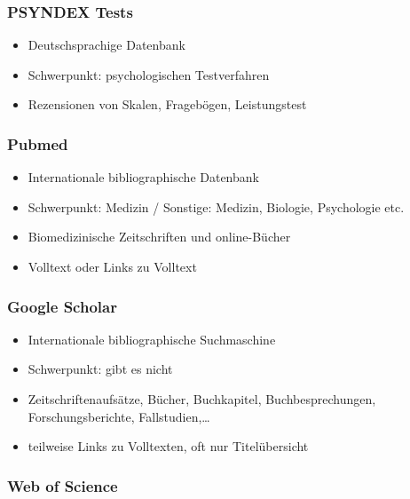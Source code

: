 \documentclass[
]{book}
\providecommand{\tightlist}{%
  \setlength{\itemsep}{0pt}\setlength{\parskip}{0pt}}
\begin{document}
\hypertarget{psyndex-tests}{%
\subsubsection{PSYNDEX Tests}\label{psyndex-tests}}

\begin{itemize}
\tightlist
\item
  Deutschsprachige Datenbank
\item
  Schwerpunkt: psychologischen Testverfahren
\item
  Rezensionen von Skalen, Fragebögen, Leistungstest
\end{itemize}

\hypertarget{pubmed}{%
\subsubsection{Pubmed}\label{pubmed}}

\begin{itemize}
\tightlist
\item
  Internationale bibliographische Datenbank
\item
  Schwerpunkt: Medizin / Sonstige: Medizin, Biologie, Psychologie etc.
\item
  Biomedizinische Zeitschriften und online-Bücher
\item
  Volltext oder Links zu Volltext
\end{itemize}

\hypertarget{google-scholar}{%
\subsubsection{Google Scholar}\label{google-scholar}}

\begin{itemize}
\tightlist
\item
  Internationale bibliographische Suchmaschine
\item
  Schwerpunkt: gibt es nicht
\item
  Zeitschriftenaufsätze, Bücher, Buchkapitel, Buchbesprechungen, Forschungsberichte, Fallstudien,\ldots{}
\item
  teilweise Links zu Volltexten, oft nur Titelübersicht
\end{itemize}

\hypertarget{web-of-science}{%
\subsubsection{Web of Science}\label{web-of-science}}
\end{document}
